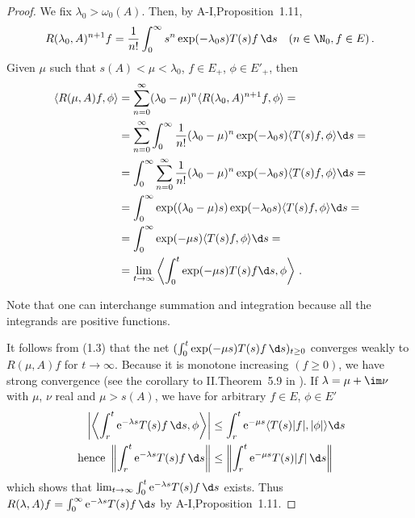 \begin{proof}
	We fix $\lambda_{0} > \omega_0(A)$.
	Then, by A-I,Proposition~1.11,
	\begin{equation}\label{eq:c3-1.2}
		R(\lambda_{0},A)^{n+1}f = \frac{1}{n!} \int_{0}^{\infty} s^n \exp(-\lambda_{0}s) T(s)f \,\d s \quad (n \in \N_{0}, f \in E)\,.
	\end{equation}
	Given $\mu$ such that $s(A) < \mu < \lambda_{0}$, $f \in E_{+}$, $\phi \in E'_{+}$, then
	\begin{equation}\label{eq:c3-1.3}
	\begin{aligned}
		\langle R(\mu,A)f,\phi\rangle &= \sum_{n=0}^{\infty} (\lambda_{0}-\mu)^n\langle R(\lambda_{0},A)^{n+1}f,\phi\rangle = \\
		&= \sum_{n=0}^{\infty} \int_{0}^{\infty} \frac{1}{n!}(\lambda_{0}-\mu)^n\exp(-\lambda_{0}s)\langle T(s)f,\phi\rangle\d s = \\
		&= \int_{0}^{\infty} \sum_{n=0}^{\infty} \frac{1}{n!}(\lambda_{0}-\mu)^n\exp(-\lambda_{0}s)\langle T(s)f,\phi\rangle\d s = \\
		&= \int_{0}^{\infty} \exp((\lambda_{0}-\mu)s)\exp(-\lambda_{0}s)\langle T(s)f,\phi\rangle\d s = \\
		&= \int_{0}^{\infty} \exp(-\mu s)\langle T(s)f,\phi\rangle\d s = \\ & = \lim_{t\to\infty}\left\langle \int_{0}^t \exp(-\mu s)T(s)f \d s,\phi\right\rangle\,.
	\end{aligned}
	\end{equation}
	
	Note that one can interchange summation and integration because all the integrands are positive functions.
	
	It follows from (1.3) that the net $(\int_{0}^t \exp(-\mu s)T(s) f \,\d s)_{t\geq 0}$ converges weakly to $R(\mu,A)f$ for $t \to \infty$.
	Because it is monotone increasing $(f \geq 0)$, we have strong convergence (see the corollary to II.Theorem~5.9 in \citet{schaefer:1974}).
%
%
If $\lambda = \mu + \im\nu$ with $\mu$, $\nu$ real and $\mu > s(A)$, we have for arbitrary $f \in E$, $\phi \in E'$
\begin{align*}
	\left|\left\langle \int_{r}^t \mathrm{e}^{-\lambda s}T(s)f \,\d s,\phi\right\rangle\right| &\leq \int_{r}^t \mathrm{e}^{-\mu s}\langle T(s)|f|,|\phi|\rangle\d s \\
	\text{ hence } \left\|\int_{r}^t \mathrm{e}^{-\lambda s}T(s)f \,\d s\right\| &\leq \left\|\int_{r}^t \mathrm{e}^{-\mu s}T(s)|f| \,\d s\right\| \
\end{align*}
which shows that $\lim_{t\to\infty} \int_{0}^t \mathrm{e}^{-\lambda s}T(s)f \,\d s$ exists.
Thus $R(\lambda,A)f = \int_{0}^{\infty} \mathrm{e}^{-\lambda s} T(s)f \,\d s$ by A-I,Proposition~1.11.


\end{proof}
